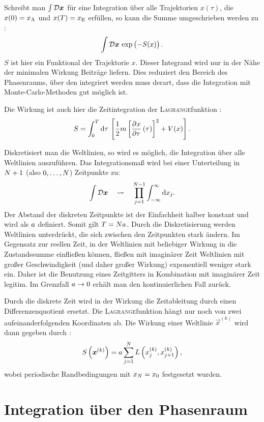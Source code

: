 Schreibt man $\int \mathcal D \boldsymbol{x}$ für eine Integration über alle
Trajektorien $x(\tau)$, die $x(0) = x_\text A$ und $x(T) = x_\text E$ erfüllen,
so kann die Summe umgeschrieben werden zu
\parencite[(2.1)]{Creutz/Statistical_Approach_QM}:
\[
    \int \funcmeasure \, \exp\del{-S(x)}.
\]
$S$ ist hier ein Funktional der Trajektorie $x$. Dieser Integrand wird nur in
der Nähe der minimalen Wirkung Beiträge liefern. Dies reduziert den Bereich des
Phasenraums, über den integriert werden muss derart, dass die Integration mit
Monte-Carlo-Methoden gut möglich ist.

Die Wirkung ist auch hier die Zeitintegration der \textsc{Lagrange}funktion
\parencite[(2.5)]{Creutz/Statistical_Approach_QM}:
\[
    S = \int_0^T \dif \tau \, \sbr{\frac 12 m \sbr{\dpd x\tau(\tau)}^2 + V(x)}.
\]

Diskretisiert man die Weltlinien, so wird es möglich, die Integration über alle
Weltlinien auszuführen. Das Integrationsmaß wird bei einer Unterteilung in
$N+1$ (also $0, \ldots, N$) Zeitpunkte zu:
\[
    \int \funcmeasure
    \quad\leadsto\quad
    \prod_{j = 1}^{\timesites-1} \int_{-\infty}^\infty \dif x_j.
\]
Der Abstand der diskreten Zeitpunkte ist der Einfachheit halber konstant und
wird als $a$ definiert. Somit gilt $T = Na$. Durch die
Diskretisierung werden Weltlinien unterdrückt, die sich zwischen den
Zeitpunkten stark ändern. Im Gegensatz zur reellen Zeit, in der Weltlinien mit
beliebiger Wirkung in die Zustandssumme einfließen können, fließen mit
imaginärer Zeit Weltlinien mit großer Geschwindigkeit (und daher großer
Wirkung) exponentiell weniger stark ein. Daher ist die Benutzung eines
Zeitgitters in Kombination mit imaginärer Zeit legitim. Im Grenzfall $a
\to 0$ erhält man den kontinuierlichen Fall zurück.

Durch die diskrete Zeit wird in der Wirkung die Zeitableitung durch einen
Differenzenquotient ersetzt. Die \textsc{Lagrange}funktion hängt nur noch von
zwei aufeinanderfolgenden Koordinaten ab. Die Wirkung einer Weltlinie $\vec
x^{(k)}$ wird dann gegeben durch
\parencite[(3.2)]{Creutz/Statistical_Approach_QM}:
\[
    S\del{\vec x^{(k)}} = \timestep \sum_{j = 1}^\timesites L\del{x_j^{(k)},
    x_{j+1}^{(k)}},
\]
wobei periodische Randbedingungen mit $x_{N} = x_0$ festgesetzt wurden.

\section{Integration über den Phasenraum}

